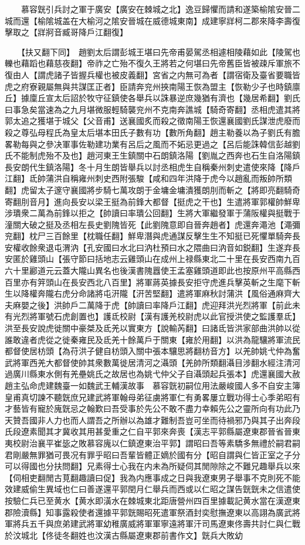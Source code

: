 　　慕容皝引兵討之軍于廣安【廣安在棘城之北】逸豆歸懼而請和遂築榆隂安晉二城而還【榆隂城盖在大榆河之隂安晉城在威德城東南】成建寧牂柯二郡來降李壽復擊取之【牂牁音臧哥降戶江翻復】

　　【扶又翻下同】　趙劉太后謂彭城王堪曰先帝甫晏駕丞相遽相陵藉如此【陵駕也轢也藉蹈也藉慈夜翻】帝祚之亡殆不復久王將若之何堪曰先帝舊臣皆被疎斥軍旅不復由人【謂虎諸子皆握兵權也被皮義翻】宮省之内無可為者【謂宿衛及臺省要職皆虎之府寮親屬無與共謀匡正者】臣請奔兖州挾南陽王恢為盟主【恢勒少子也時鎮廪丘】據廩丘宣太后詔於牧守征鎮使各舉兵以誅暴逆庶幾猶有濟也【幾居希翻】劉氏曰事急矣當速為之九月堪微服輕騎襲兖州不克南奔譙城【騎奇寄翻】丞相虎遣其將郭太追之獲堪于城父【父音甫】送襄國炙而殺之徵南陽王恢還襄國劉氏謀泄虎廢而殺之尊弘母程氏為皇太后堪本田氏子數有功【數所角翻】趙主勒養以為子劉氏有膽畧勒每與之參决軍事佐勒建功業有呂后之風而不妬忌更過之【呂后能誅韓信彭越劉氏不能制虎殆不及也】趙河東王生鎮關中石朗鎮洛陽【劉胤之西奔也石生自洛陽鎮長安朗代生鎮洛陽】冬十月生朗皆舉兵以討丞相虎生自稱秦州刺史遣使來降【降戶江翻】氐帥蒲洪自稱雍州刺史西附張駿【咸和四年洪降于虎今以趙亂而叛帥所類翻】虎留太子邃守襄國將步騎七萬攻朗于金墉金墉潰獲朗刖而斬之【將即亮翻騎奇寄翻刖音月】進向長安以梁王挺為前鋒大都督【挺虎之干也】生遣將軍郭權帥鮮卑涉璝衆二萬為前鋒以拒之【帥讀曰率璝公回翻】生將大軍繼發軍于蒲阪權與挺戰于潼關大破之挺及丞相左長史劉隗皆死【此劉隗意即自晉奔趙者】虎還奔澠池【澠彌兖翻】枕尸三百餘里【枕職任翻】鮮卑潛與虎通謀反擊生生不知挺已死懼單騎奔長安權收餘衆退屯渭汭【孔安國曰水北曰汭杜預曰水之隈曲曰汭音如鋭翻】生遂弃長安匿於雞頭山【張守節曰括地志云雞頭山在成州上禄縣東北二十里在長安西南九百六十里酈道元云蓋大隴山異名也後漢書隗囂使王孟塞雞頭道即此也按原州平高縣西百里亦有笄頭山在長安西北八百里】將軍蔣英據長安拒守虎進兵擊英斬之生麾下斬生以降權奔隴右虎分命諸將屯汧隴【汧苦堅翻】遣將軍麻秋討蒲洪【風俗通麻齊大夫麻嬰之後】洪帥戶二萬降于虎【帥讀曰率降戶江翻】虎迎拜洪光烈將軍【前此未有光烈將軍號石虎創置也】護氐校尉【漢有護羌校尉虎以此官授洪使之監護羣氐】洪至長安說虎徙關中豪桀及氐羌以實東方【說輸芮翻】曰諸氐皆洪家部曲洪帥以從誰敢違者虎從之徙秦雍民及氐羌十餘萬戶于關東【雍於用翻】以洪為龍驤將軍流民都督使居枋頭【為苻洪子健自枋頭入關中張本驤思將翻枋音方】以羌帥姚弋仲為奮武將軍西羌大都督使帥其衆數萬徙居清河之灄頭【羌帥所類翻灄目涉翻水經注清河過廣川縣東水側有羌壘姚氏之故居也為姚弋仲父子自灄頭起兵張本】虎還襄國大赦趙主弘命虎建魏臺一如魏武王輔漢故事　慕容皝初嗣位用法嚴峻國人多不自安主簿皇甫真切諫不聽皝庶兄建武將軍翰母弟征虜將軍仁有勇畧屢立戰功得士心季弟昭有才藝皆有寵於廆皝忌之翰歎曰吾受事於先公不敢不盡力幸賴先公之靈所向有功此乃天贊吾國非人力也而人謂吾之所辦以為雄才難制吾豈可坐而待禍邪乃與其子出奔段氏段遼素聞其才冀收其用甚愛重之仁自平郭來奔喪【漢志平郭縣屬遼東郡晉省晉東夷校尉治襄平崔毖之敗慕容廆以仁鎮遼東治平郭】謂昭曰吾等素驕多無禮於嗣君嗣君剛嚴無罪猶可畏况有罪乎昭曰吾輩皆體正嫡於國有分【昭自謂與仁皆正室之子分可以得國也分扶問翻】兄素得士心我在内未為所疑伺其閒隙除之不難兄趣舉兵以來【伺相吏翻閒古莧翻趣讀曰促】我為内應事成之日與我遼東男子舉事不克則死不能效建威偷生異域也仁曰善遂還平郭閏月仁舉兵而西或以仁昭之謀告皝皝未之信遣使按驗仁兵已至黄水【黄水即潢水在棘城東北距唐營州四百里據載記黄水當在漢遼東郡險瀆縣】知事露殺使者還據平郭皝賜昭死遣軍祭酒封奕慰撫遼東以高詡為廣武將軍將兵五千與庶弟建武將軍幼稚廣威將軍軍寧遠將軍汗司馬遼東佟壽共討仁與仁戰於汶城北【佟徒冬翻姓也汶漢古縣屬遼東郡前書作文】皝兵大敗幼